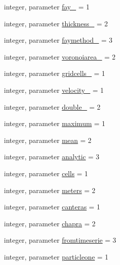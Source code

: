 \begin{DoxyCompactItemize}
\item 
integer, parameter \mbox{\hyperlink{namespacemodulelagrangianglobal_a6367315ec296b73d63c46a4c9f2dea95}{fay\+\_\+}} = 1
\item 
integer, parameter \mbox{\hyperlink{namespacemodulelagrangianglobal_a074b9b030351bd4c08790df1e8665391}{thickness\+\_\+}} = 2
\item 
integer, parameter \mbox{\hyperlink{namespacemodulelagrangianglobal_a55ccaed1b69206d7c4650f3252a9d0f9}{faymethod\+\_\+}} = 3
\item 
integer, parameter \mbox{\hyperlink{namespacemodulelagrangianglobal_ad16e0f7a15557ac75733a581795ed7ac}{voronoiarea\+\_\+}} = 2
\item 
integer, parameter \mbox{\hyperlink{namespacemodulelagrangianglobal_ace93ef173b0abecd57fac75827433f43}{gridcells\+\_\+}} = 1
\item 
integer, parameter \mbox{\hyperlink{namespacemodulelagrangianglobal_ad060a508565823d7304e4127d77e52fd}{velocity\+\_\+}} = 1
\item 
integer, parameter \mbox{\hyperlink{namespacemodulelagrangianglobal_a1e3eb95b8791b49ea88b9514ec4eb081}{double\+\_\+}} = 2
\item 
integer, parameter \mbox{\hyperlink{namespacemodulelagrangianglobal_ae42890aff5a3e3e393ac7e4f96d1a73e}{maximum}} = 1
\item 
integer, parameter \mbox{\hyperlink{namespacemodulelagrangianglobal_a98e7a31f70f9302a914cb9cba0481c47}{mean}} = 2
\item 
integer, parameter \mbox{\hyperlink{namespacemodulelagrangianglobal_ae13a67c54c4c2a149f2ae49115c6fe94}{analytic}} = 3
\item 
integer, parameter \mbox{\hyperlink{namespacemodulelagrangianglobal_a883f600b6a938b9cb6645414a7f813c0}{cells}} = 1
\item 
integer, parameter \mbox{\hyperlink{namespacemodulelagrangianglobal_a05abdbc2950cbbc6d8cfcbeea7f3ae22}{meters}} = 2
\item 
integer, parameter \mbox{\hyperlink{namespacemodulelagrangianglobal_a6a1d48f117533bfa05114a1d9180ea6f}{canteras}} = 1
\item 
integer, parameter \mbox{\hyperlink{namespacemodulelagrangianglobal_a390066d8a858f9de06ab1dfc1456897d}{chapra}} = 2
\item 
integer, parameter \mbox{\hyperlink{namespacemodulelagrangianglobal_abdc80f8446abcc803e1b4a76eccd45b2}{fromtimeserie}} = 3
\item 
integer, parameter \mbox{\hyperlink{namespacemodulelagrangianglobal_a581a217d7c4160223d988c8e86742814}{particleone}} = 1

\end{DoxyCompactItemize}
